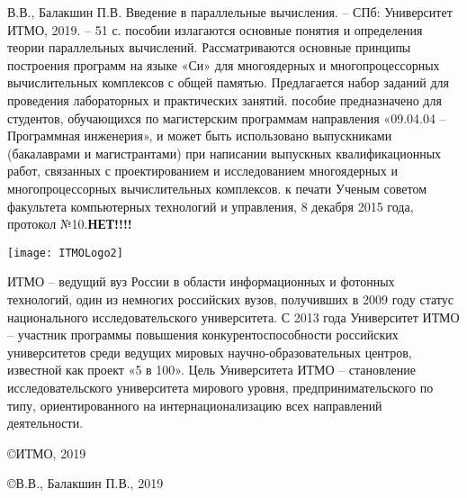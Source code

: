 { %
	\thispagestyle{empty} %
	 В.В., Балакшин П.В. Введение в параллельные вычисления. – СПб: Университет ИТМО, 2019. – 51 с.
	\newline
	\newline
	 пособии излагаются основные понятия и определения теории параллельных вычислений. Рассматриваются основные принципы построения программ на языке «Си» для многоядерных и многопроцессорных вычислительных комплексов с общей памятью. Предлагается набор заданий для проведения лабораторных и практических занятий.
	\newline
	\newline
	 пособие предназначено для студентов, обучающихся по магистерским программам направления «09.04.04 – Программная инженерия», и может быть использовано выпускниками (бакалаврами и магистрантами) при написании выпускных квалификационных работ, связанных с проектированием и исследованием многоядерных и многопроцессорных вычислительных комплексов.
	\newline
	\newline
	 к печати Ученым советом факультета компьютерных технологий и управления, 8 декабря 2015 года, протокол №10.\textbf{НЕТ!!!!}
	\vspace*{\fill} %
	\begin{flushright}
		\texttt{[image: ITMOLogo2]}
	\end{flushright}
	 ИТМО – ведущий вуз России в области информационных и фотонных технологий, один из немногих российских вузов, получивших в 2009 году статус национального исследовательского университета. С 2013 года Университет ИТМО – участник программы повышения конкурентоспособности российских университетов среди ведущих мировых научно-образовательных центров, известной как проект «5 в 100». Цель Университета ИТМО – становление исследовательского университета мирового уровня, предпринимательского по типу, ориентированного на интернационализацию всех направлений деятельности.
	\begin{flushright}
		\copyright{} ИТМО, 2019
		\par\copyright{} В.В., Балакшин П.В., 2019
	\end{flushright}
}
